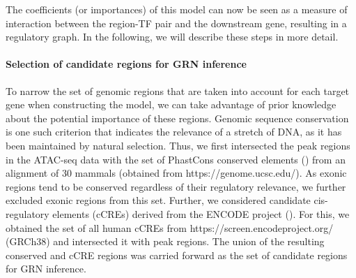 The coefficients (or importances) of this model can now be seen as a measure of interaction between the region-TF pair and the downstream gene, resulting in a regulatory graph. In the following, we will describe these steps in more detail.
 
\paragraph{Selection of candidate regions for GRN inference}
To narrow the set of genomic regions that are taken into account for each target gene when constructing the model, we can take advantage of prior knowledge about the potential importance of these regions. Genomic sequence conservation is one such criterion that indicates the relevance of a stretch of DNA, as it has been maintained by natural selection. Thus, we first intersected the peak regions in the ATAC-seq data with the set of PhastCons conserved elements (\cite{siepel_evolutionarily_2005}) from an alignment of 30 mammals (obtained from https://genome.ucsc.edu/). As exonic regions tend to be conserved regardless of their regulatory relevance, we further excluded exonic regions from this set. Further, we considered candidate cis-regulatory elements (cCREs) derived from the ENCODE project (\cite{encode_project_consortium_expanded_2020}). For this, we obtained the set of all human cCREs from https://screen.encodeproject.org/ (GRCh38) and intersected it with peak regions. The union of the resulting conserved and cCRE regions was carried forward as the set of candidate regions for GRN inference.
 
